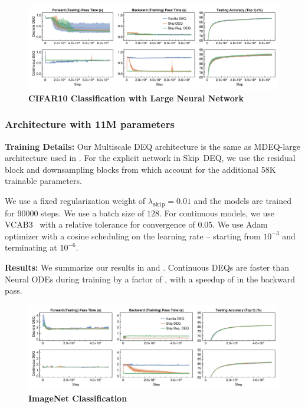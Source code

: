 \begin{figure}[t]
    \centering
    \includegraphics[width=\linewidth]{../figures/deep_equilibrium_models/cifar10_large}
    \caption{\textbf{CIFAR10 Classification with Large Neural Network}}
    \label{fig:cifar10_large}
\end{figure}

\subsubsection{Architecture with 11M parameters}

\textbf{Training Details:} Our Multiscale DEQ architecture is the same as MDEQ-large architecture used in \citet{bai_multiscale_2020}. For the explicit network in Skip~DEQ, we use the residual block and downsampling blocks from \citet{bai_multiscale_2020} which account for the additional 58K trainable parameters.

We use a fixed regularization weight of $\lambda_{\texttt{skip}} = 0.01$ and the models are trained for 90000 steps. We use a batch size of $128$. For continuous models, we use VCAB3~\citep{wanner1996solving} with a relative tolerance for convergence of $0.05$. We use Adam~\citep{kingma2014adam} optimizer with a cosine scheduling on the learning rate -- starting from $10^{-3}$ and terminating at $10^{-6}$.

\textbf{Results:} We summarize our results in  and . Continuous DEQs are faster than Neural ODEs during training by a factor of , with a speedup of  in the backward pass.


\begin{figure}[t]
    \centering
    \includegraphics[width=\linewidth]{../figures/deep_equilibrium_models/imagenet_small}
    \caption{\textbf{ImageNet Classification}}
    \label{fig:imagenet_small}
\end{figure}
